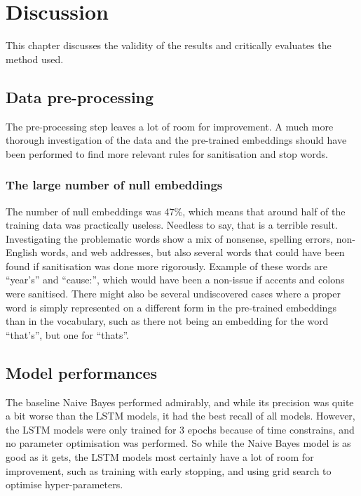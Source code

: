 \chapter{Discussion}
This chapter discusses the validity of the results and critically
evaluates the method used.


\section{Data pre-processing}
The pre-processing step leaves a lot of room for improvement. A much
more thorough investigation of the data and the pre-trained embeddings
should have been performed to find more relevant rules for
sanitisation and stop words. 

\subsection{The large number of null embeddings}
The number of null embeddings was 47\%, which means that around half
of the training data was practically useless. Needless to say, that is
a terrible result. Investigating the
problematic words show a mix of nonsense, spelling errors, non-English
words, and web addresses, but also several words that could have been found if sanitisation was
done more rigorously. Example of these words are ``year’s'' and
``cause:'', which would have been a non-issue if accents and colons
were sanitised. There might also be several undiscovered cases where a proper
word is simply represented on a different form in the pre-trained
embeddings than in the vocabulary, such as there not being an embedding for the word
``that's'', but one for ``thats''.

\section{Model performances}
The baseline Naive Bayes performed admirably, and while its precision was quite a
bit worse than the LSTM models, it had the best recall of all
models. However, the LSTM models were only trained for 3 epochs
because of time constrains, and no parameter optimisation was
performed. So while the Naive Bayes model is as good as it gets, the
LSTM models most certainly have a lot of room for improvement, such as
training with early stopping, and using grid search to optimise hyper-parameters.

